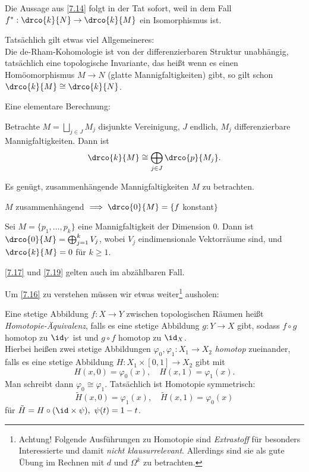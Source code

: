 Die Aussage aus \ref{7.14} folgt in der Tat sofort, weil in dem Fall $ f^*: \drco{k}{N} \to \drco{k}{M} $ ein Isomorphismus ist.

\begin{rem}\label{7.16}
	Tatsächlich gilt etwas viel Allgemeineres:\\
	Die de-Rham-Kohomologie ist von der differenzierbaren Struktur unabhängig, tatsächlich eine topologische Invariante, das heißt wenn es einen Homöomorphismus $M \to N$ (glatte Mannigfaltigkeiten) gibt, so gilt schon $ \drco{k}{M} \cong \drco{k}{N} $.
\end{rem}

\noindent Eine elementare Berechnung:

\begin{lem}\label{7.17}
	Betrachte $ M = \bigsqcup_{j \in J} M_j $ disjunkte Vereinigung, $J$ endlich, $M_j$ differenzierbare Mannigfaltigkeiten. Dann ist 
	\[ \drco{k}{M} \cong \bigoplus_{j \in J} \drco{p}{M_j}. \]
\end{lem}

\begin{cor*}
	Es genügt, zusammenhängende Mannigfaltigkeiten $M$ zu betrachten.
\end{cor*}

\begin{lem}
	$M$ zusammenhängend $\implies \drco{0}{M} = \{  f $ konstant$\}$ 
\end{lem}

\begin{cor}\label{7.19}
	Sei $ M = \{ p_1, \dotsc, p_k \} $ eine Mannigfaltigkeit der Dimension 0. Dann ist $ \drco{0}{M} = \bigoplus_{j=1}^k V_j $, wobei $V_j$ eindimensionale Vektorräume sind, und $\drco{k}{M} = 0$ für $k \geq 1$.
\end{cor}

\begin{rem*}
	\ref{7.17} und \ref{7.19} gelten auch im abzählbaren Fall.
\end{rem*}

Um \ref{7.16} zu verstehen müssen wir etwas weiter\footnote{Achtung! Folgende Ausführungen zu Homotopie sind \emph{Extrastoff} für besonders Interessierte und damit \emph{nicht klausurrelevant}. Allerdings sind sie als gute Übung im Rechnen mit $d$ und $\Omega^k$ zu betrachten.} ausholen:

\begin{defn}
	Eine stetige Abbildung $f: X \to Y$ zwischen topologischen Räumen heißt \emph{Homotopie-Äquivalenz}, falls es eine stetige Abbildung $g: Y \to X$ gibt, sodass $f \circ g$ homotop zu $\id_Y$ ist und $g \circ f$ homotop zu $\id_X$.\\
	Hierbei heißen zwei stetige Abbildungen $ \varphi_0, \varphi_1: X_1 \to X_2 $ \emph{homotop} zueinander, falls es eine stetige Abbildung $ H: X_1 \times [0,1] \to X_2 $ gibt mit
	\[ H(x,0) = \varphi_0(x),\quad H(x,1) = \varphi_1(x). \] Man schreibt dann $ \varphi_0 \cong \varphi_1 $. Tatsächlich ist Homotopie symmetrisch:
	\[ \tilde{H}(x,0) = \varphi_1(x), \quad \tilde{H}(x,1) = \varphi_0(x) \]
	für \( \tilde{H} = H \circ (\id \times \psi),\ \psi(t) = 1-t \).
\end{defn}

